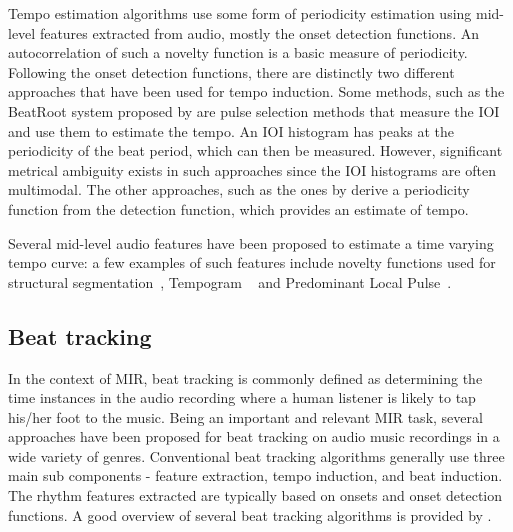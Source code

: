 Tempo estimation algorithms use some form of periodicity estimation using mid-level features extracted from audio, mostly the onset detection functions. An autocorrelation of such a novelty function is a basic measure of periodicity. Following the onset detection functions, there are distinctly two different approaches that have been used for tempo induction. Some methods, such as the BeatRoot system proposed by  are pulse selection methods that measure the \gls{IOI} and use them to estimate the tempo. An \gls{IOI} histogram has peaks at the periodicity of the beat period, which can then be measured. However, significant metrical ambiguity exists in such approaches since the \gls{IOI} histograms are often multimodal. The other approaches, such as the ones by  derive a periodicity function from the detection function, which provides an estimate of tempo. 

Several mid-level audio features have been proposed to estimate a time varying tempo curve: a few examples of such features include novelty functions used for structural segmentation~\cite{foote:00:novelty}, Tempogram
~\cite{grosche:11:tempogram} and Predominant Local Pulse~\cite{grosche:11:pulse}. %
% 
\subsection{Beat tracking}\label{sec:bkgnd:beattrack}
In the context of \gls{MIR}, beat tracking is commonly defined as determining the time instances in the audio recording where a human listener is likely to tap his/her foot to the music. Being an important and relevant \gls{MIR} task, several approaches have been proposed for beat tracking on audio music recordings in a wide variety of genres. Conventional beat tracking algorithms generally use three main sub components - feature extraction, tempo induction, and beat induction. The rhythm features extracted are typically based on onsets and onset detection functions. A good overview of several beat tracking algorithms is provided by . 

